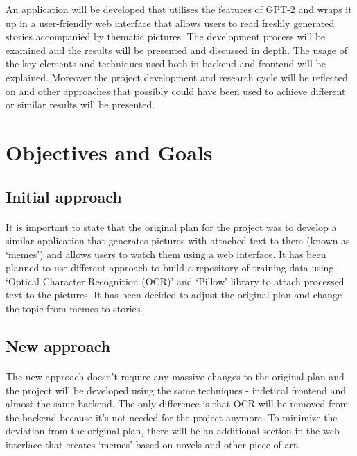 \documentclass[12pt]{report}
\begin{document}
An application will be developed that utilises the features of GPT-2 and wraps it up in a user-friendly web
interface that allows users to read freshly generated stories accompanied by thematic pictures. The development process 
will be examined and the results will be presented and discussed in depth. The usage of the key elements and techniques used both in
backend and frontend will be explained. Moreover the project development and research cycle will be reflected on and 
other approaches that possibly could have been used to achieve different or similar results will be presented.

\section*{Objectives and Goals}

\subsection*{Initial approach}
\paragraph{}
It is important to state that the original plan for the project was to develop a similar application that generates
pictures with attached text to them (known as `memes') and allows users to watch them using a web interface. It has been
planned to use different approach to build a repository of training data using `Optical Character Recognition (OCR)' \citep{tesseract_article} and 
`Pillow' library to attach processed text to the pictures. It has been decided to adjust the original plan and change the
topic from memes to stories.

\subsection*{New approach}
\paragraph{}
The new approach doesn't require any massive changes to the original plan and the project will be developed using the same
techniques - indetical frontend and almost the same backend. The only difference is that OCR will be removed from the backend
because it's not needed for the project anymore. To minimize the deviation from the original plan, there will be an
additional section in the web interface that creates `memes' based on novels and other piece of art.
\end{document}
